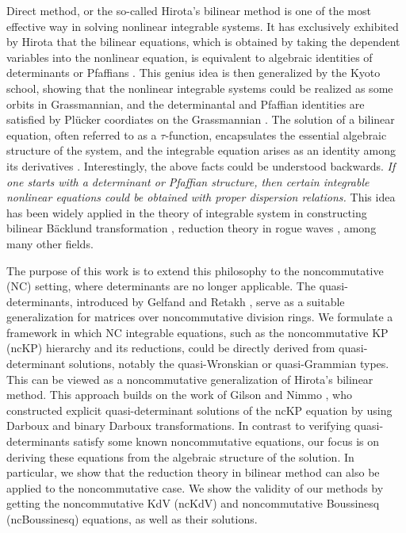 \documentclass[11p,reqno]{amsart}
\numberwithin{equation}{section}
\numberwithin{equation}{section}
\begin{document}
Direct method, or the so-called Hirota's bilinear method is one of the most effective way in solving nonlinear integrable systems. It has exclusively exhibited by Hirota that the bilinear equations, which is obtained by taking the dependent variables into the nonlinear equation, is equivalent to algebraic 
identities of determinants or Pfaffians \cite{hirota04}. This genius idea is then generalized by the Kyoto school, showing that the nonlinear integrable systems could be realized as some orbits in Grassmannian, and the determinantal and Pfaffian identities are satisfied by Pl\"ucker coordiates on the Grassmannian \cite{sato83}. The solution of a bilinear equation, often referred to as a $\tau$-function, encapsulates the essential algebraic structure of the system, and the integrable equation arises as an identity among its derivatives  \cite{hirota71,hirota04,sato83,date82}.
Interestingly, the above facts could be understood backwards. \emph{If one starts with a determinant or Pfaffian structure, then certain integrable nonlinear equations could be obtained with proper dispersion relations.} This idea has been widely applied in the theory of integrable system in constructing bilinear B\"acklund transformation \cite{nimmo84,nimmo83}, reduction theory in rogue waves \cite{ohta14,feng22}, among many other fields. 


The purpose of this work is to extend this philosophy to the noncommutative (NC) setting, where  determinants are no longer applicable. The quasi-determinants, introduced by Gelfand and Retakh \cite{gelfand91,gelfand05}, serve as a suitable generalization for matrices over noncommutative division rings. We formulate a framework in which NC integrable equations, such as the noncommutative KP (ncKP) hierarchy and its reductions, could be directly derived from quasi-determinant solutions, notably the quasi-Wronskian or quasi-Grammian types. This can be viewed as a noncommutative generalization of Hirota's bilinear method. This approach builds on the work of Gilson and Nimmo \cite{gilson07}, who constructed explicit quasi-determinant solutions of the ncKP equation by using Darboux and binary Darboux transformations. In contrast to verifying quasi-determinants satisfy some known noncommutative equations, our focus is on deriving these equations from the algebraic structure of the solution. In particular, we show that the reduction theory in bilinear method can also be applied to the noncommutative case. We show the validity of our methods by getting the noncommutative KdV (ncKdV) and noncommutative Boussinesq (ncBoussinesq) equations, as well as their solutions. 
\end{document}
